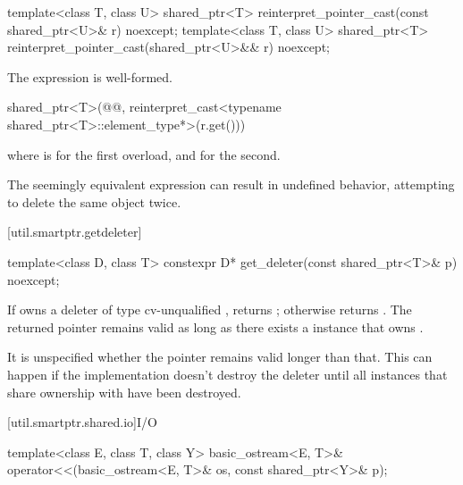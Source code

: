 %
\begin{itemdecl}
template<class T, class U>
  shared_ptr<T> reinterpret_pointer_cast(const shared_ptr<U>& r) noexcept;
template<class T, class U>
  shared_ptr<T> reinterpret_pointer_cast(shared_ptr<U>&& r) noexcept;
\end{itemdecl}

\begin{itemdescr}
\pnum
\mandates
The expression  is well-formed.

\pnum
\returns
\begin{codeblock}
shared_ptr<T>(@@, reinterpret_cast<typename shared_ptr<T>::element_type*>(r.get()))
\end{codeblock}
where  is  for the first overload, and
 for the second.

\pnum
\begin{note}
The seemingly equivalent expression
 can result in
undefined behavior, attempting to delete the same object twice.
\end{note}
\end{itemdescr}

[util.smartptr.getdeleter]{}

%
\begin{itemdecl}
template<class D, class T>
  constexpr D* get_deleter(const shared_ptr<T>& p) noexcept;
\end{itemdecl}

\begin{itemdescr}
\pnum
\returns
If  owns a deleter  of type cv-unqualified
, returns ; otherwise returns .
The returned
pointer remains valid as long as there exists a  instance
that owns .
\begin{note}
It is unspecified whether the pointer
remains valid longer than that. This can happen if the implementation doesn't destroy
the deleter until all  instances that share ownership with
 have been destroyed.
\end{note}
\end{itemdescr}

[util.smartptr.shared.io]{I/O}

%
\begin{itemdecl}
template<class E, class T, class Y>
  basic_ostream<E, T>& operator<<(basic_ostream<E, T>& os, const shared_ptr<Y>& p);
\end{itemdecl}

